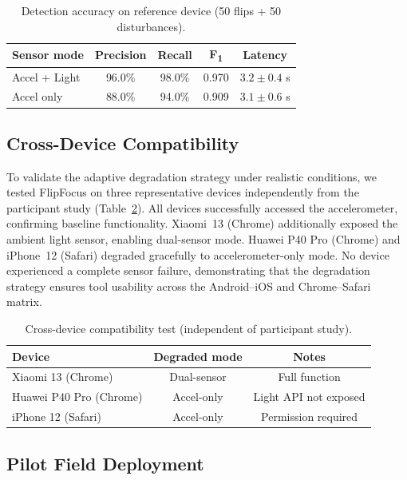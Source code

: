 \documentclass[sigconf]{acmart}
\begin{document}
\begin{table}[htbp]
  \centering
  \small
  \caption{Detection accuracy on reference device (50 flips + 50 disturbances).}
  \label{tab:accuracy}
  \begin{tabular}{lcccc}
    \toprule
    \textbf{Sensor mode} & \textbf{Precision} & \textbf{Recall} & \textbf{F\textsubscript{1}} & \textbf{Latency} \\
    \midrule
    Accel + Light & 96.0\% & 98.0\% & 0.970 & $3.2 \pm 0.4$ s \\
    Accel only    & 88.0\% & 94.0\% & 0.909 & $3.1 \pm 0.6$ s \\
    \bottomrule
  \end{tabular}
\end{table}

\subsection{Cross-Device Compatibility}

To validate the adaptive degradation strategy under realistic conditions, we tested FlipFocus on three representative devices independently from the participant study (Table~\ref{tab:compat}). All devices successfully accessed the accelerometer, confirming baseline functionality. Xiaomi~13 (Chrome) additionally exposed the ambient light sensor, enabling dual-sensor mode. Huawei P40 Pro (Chrome) and iPhone~12 (Safari) degraded gracefully to accelerometer-only mode. No device experienced a complete sensor failure, demonstrating that the degradation strategy ensures tool usability across the Android--iOS and Chrome--Safari matrix.

\begin{table}[htbp]
  \centering
  \small
  \caption{Cross-device compatibility test (independent of participant study).}
  \label{tab:compat}
  \begin{tabular}{lcc}
    \toprule
    \textbf{Device} & \textbf{Degraded mode} & \textbf{Notes} \\
    \midrule
    Xiaomi 13 (Chrome)   & Dual-sensor & Full function \\
    Huawei P40 Pro (Chrome) & Accel-only & Light API not exposed \\
    iPhone 12 (Safari)   & Accel-only & Permission required \\
    \bottomrule
  \end{tabular}
\end{table}

\subsection{Pilot Field Deployment}
\end{document}
